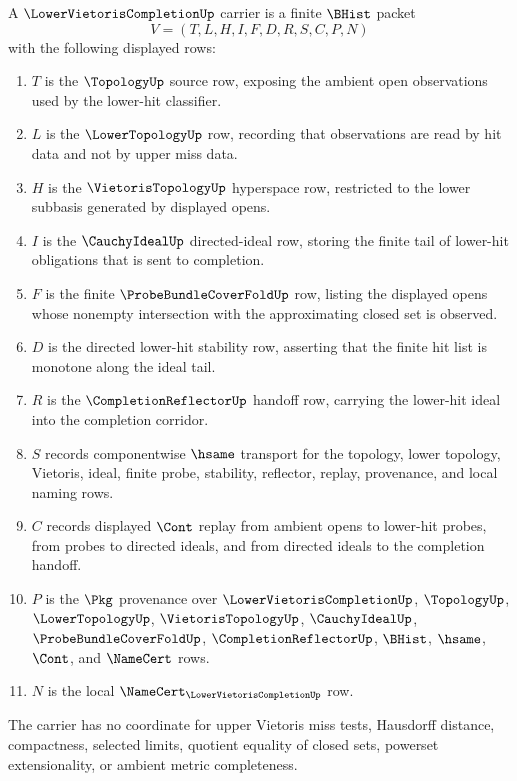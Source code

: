 \begin{definition}
\label{def:lower-vietoris-completion-carrier}
A $\LowerVietorisCompletionUp$ carrier is a finite $\BHist$ packet
$$
V=(T,L,H,I,F,D,R,S,C,P,N)
$$
with the following displayed rows:
\begin{enumerate}
\item $T$ is the $\TopologyUp$ source row, exposing the ambient open observations used by the lower-hit classifier.
\item $L$ is the $\LowerTopologyUp$ row, recording that observations are read by hit data and not by upper miss data.
\item $H$ is the $\VietorisTopologyUp$ hyperspace row, restricted to the lower subbasis generated by displayed opens.
\item $I$ is the $\CauchyIdealUp$ directed-ideal row, storing the finite tail of lower-hit obligations that is sent to completion.
\item $F$ is the finite $\ProbeBundleCoverFoldUp$ row, listing the displayed opens whose nonempty intersection with the approximating closed set is observed.
\item $D$ is the directed lower-hit stability row, asserting that the finite hit list is monotone along the ideal tail.
\item $R$ is the $\CompletionReflectorUp$ handoff row, carrying the lower-hit ideal into the completion corridor.
\item $S$ records componentwise $\hsame$ transport for the topology, lower topology, Vietoris, ideal, finite probe, stability, reflector, replay, provenance, and local naming rows.
\item $C$ records displayed $\Cont$ replay from ambient opens to lower-hit probes, from probes to directed ideals, and from directed ideals to the completion handoff.
\item $P$ is the $\Pkg$ provenance over $\LowerVietorisCompletionUp$, $\TopologyUp$, $\LowerTopologyUp$, $\VietorisTopologyUp$, $\CauchyIdealUp$, $\ProbeBundleCoverFoldUp$, $\CompletionReflectorUp$, $\BHist$, $\hsame$, $\Cont$, and $\NameCert$ rows.
\item $N$ is the local $\NameCert_{\LowerVietorisCompletionUp}$ row.
\end{enumerate}
The carrier has no coordinate for upper Vietoris miss tests, Hausdorff distance, compactness, selected limits, quotient equality of closed sets, powerset extensionality, or ambient metric completeness.
\end{definition}

